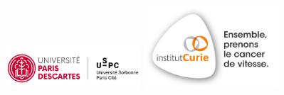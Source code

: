 \documentclass[12pt,]{book}
\title{}
\author{}
\date{}
\theoremstyle{definition}
\theoremstyle{definition}
\theoremstyle{definition}
\theoremstyle{remark}
\begin{document}
\begin{titlepage}
\frontmatter
\begin{center}
\begin{figure}[!htb]
   \begin{minipage}{0.48\textwidth}
     \centering
\includegraphics[width=5cm, left]{figures-ext/LogoParisDescartes}
   \end{minipage}\hfill
   \begin {minipage}{0.48\textwidth}
     \centering
\includegraphics[width=5cm, right]{figures-ext/CURIE}
   \end{minipage}
\end{figure}


\end{center}
\end{titlepage}
\end{document}

